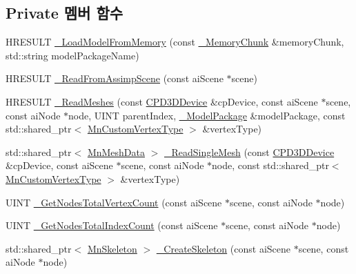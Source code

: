\subsection*{Private 멤버 함수}
\begin{DoxyCompactItemize}
\item 
H\+R\+E\+S\+U\+LT \hyperlink{class_m_n_l_1_1_mn_resource_pool_a6ceea12d9897374afb3bccf7194e1702}{\+\_\+\+Load\+Model\+From\+Memory} (const \hyperlink{struct_m_n_l_1_1_mn_resource_pool_1_1___memory_chunk}{\+\_\+\+Memory\+Chunk} \&memory\+Chunk, std\+::string model\+Package\+Name)
\item 
H\+R\+E\+S\+U\+LT \hyperlink{class_m_n_l_1_1_mn_resource_pool_a455ca59fa1823515c934b62812ef7166}{\+\_\+\+Read\+From\+Assimp\+Scene} (const ai\+Scene $\ast$scene)
\item 
H\+R\+E\+S\+U\+LT \hyperlink{class_m_n_l_1_1_mn_resource_pool_a69b5a13be982eeca8212d83d9dd7731c}{\+\_\+\+Read\+Meshes} (const \hyperlink{namespace_m_n_l_a1eec210db8f309a4a9ac0d9658784c31}{C\+P\+D3\+D\+Device} \&cp\+Device, const ai\+Scene $\ast$scene, const ai\+Node $\ast$node, U\+I\+NT parent\+Index, \hyperlink{struct_m_n_l_1_1_mn_resource_pool_1_1___model_package}{\+\_\+\+Model\+Package} \&model\+Package, const std\+::shared\+\_\+ptr$<$ \hyperlink{class_m_n_l_1_1_mn_custom_vertex_type}{Mn\+Custom\+Vertex\+Type} $>$ \&vertex\+Type)
\item 
std\+::shared\+\_\+ptr$<$ \hyperlink{class_m_n_l_1_1_mn_mesh_data}{Mn\+Mesh\+Data} $>$ \hyperlink{class_m_n_l_1_1_mn_resource_pool_a5e09efdbde37ec94da31e1d5bc1f8c5b}{\+\_\+\+Read\+Single\+Mesh} (const \hyperlink{namespace_m_n_l_a1eec210db8f309a4a9ac0d9658784c31}{C\+P\+D3\+D\+Device} \&cp\+Device, const ai\+Scene $\ast$scene, const ai\+Node $\ast$node, const std\+::shared\+\_\+ptr$<$ \hyperlink{class_m_n_l_1_1_mn_custom_vertex_type}{Mn\+Custom\+Vertex\+Type} $>$ \&vertex\+Type)
\item 
U\+I\+NT \hyperlink{class_m_n_l_1_1_mn_resource_pool_a3e4f54d9329c3b64189490661bb5e9ab}{\+\_\+\+Get\+Nodes\+Total\+Vertex\+Count} (const ai\+Scene $\ast$scene, const ai\+Node $\ast$node)
\item 
U\+I\+NT \hyperlink{class_m_n_l_1_1_mn_resource_pool_a1bd1147f1e190da5526b2de97befca99}{\+\_\+\+Get\+Nodes\+Total\+Index\+Count} (const ai\+Scene $\ast$scene, const ai\+Node $\ast$node)
\item 
std\+::shared\+\_\+ptr$<$ \hyperlink{class_m_n_l_1_1_mn_skeleton}{Mn\+Skeleton} $>$ \hyperlink{class_m_n_l_1_1_mn_resource_pool_a8975b99366a685237e6d49d3c7bf0f51}{\+\_\+\+Create\+Skeleton} (const ai\+Scene $\ast$scene, const ai\+Node $\ast$node)

\end{DoxyCompactItemize}
